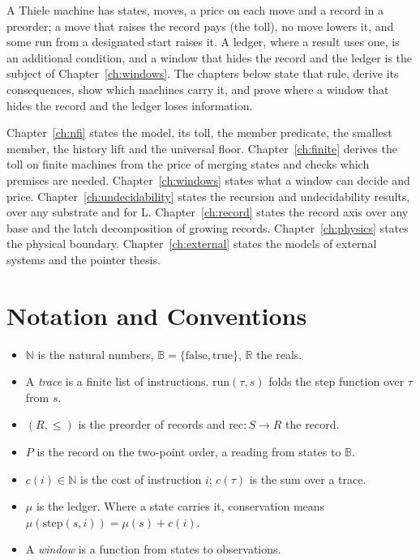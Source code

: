 \documentclass[11pt, a4paper]{report}
\theoremstyle{definition}
\theoremstyle{plain}
\newcommand{\N}{\mathbb{N}}
\newcommand{\Reals}{\mathbb{R}}
\newcommand{\B}{\mathbb{B}}
\newcommand{\cost}{c}
\newcommand{\cert}{P}
\begin{document}
A Thiele machine has states, moves, a price on each move and a record in a preorder; a move that raises the record pays (the toll), no move lowers it, and some run from a designated start raises it. A ledger, where a result uses one, is an additional condition, and a window that hides the record and the ledger is the subject of Chapter~\ref{ch:windows}. The chapters below state that rule, derive its consequences, show which machines carry it, and prove where a window that hides the record and the ledger loses information.

Chapter~\ref{ch:nfi} states the model, its toll, the member predicate, the smallest member, the history lift and the universal floor. Chapter~\ref{ch:finite} derives the toll on finite machines from the price of merging states and checks which premises are needed. Chapter~\ref{ch:windows} states what a window can decide and price. Chapter~\ref{ch:undecidability} states the recursion and undecidability results, over any substrate and for L. Chapter~\ref{ch:record} states the record axis over any base and the latch decomposition of growing records. Chapter~\ref{ch:physics} states the physical boundary. Chapter~\ref{ch:external} states the models of external systems and the pointer thesis.

\chapter{Notation and Conventions}

\begin{itemize}
  \item $\N$ is the natural numbers, $\B = \{\mathrm{false}, \mathrm{true}\}$, $\Reals$ the reals.
  \item A \emph{trace} is a finite list of instructions. $\mathrm{run}(\tau, s)$ folds the step function over $\tau$ from $s$.
  \item $(R,\le)$ is the preorder of records and $\mathrm{rec} : S \to R$ the record.
  \item $\cert$ is the record on the two-point order, a reading from states to $\B$.
  \item $\cost(i) \in \N$ is the cost of instruction $i$; $\cost(\tau)$ is the sum over a trace.
  \item $\mu$ is the ledger. Where a state carries it, conservation means $\mu(\mathrm{step}(s,i)) = \mu(s) + \cost(i)$.
  \item A \emph{window} is a function from states to observations.
\end{itemize}
\end{document}
